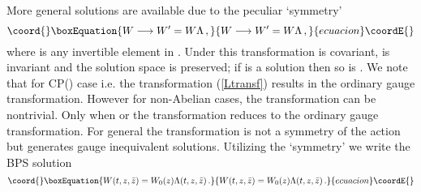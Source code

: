 \documentclass[a4paper,12pt]{article}
\def\Com{{\mathop{\hbox{\msym \char  '103}}}}
\begin{document}
More general solutions are available due to the peculiar \myHighlight{$GL(M,\Com)$}\coordHE{}  `symmetry'
\begin{equation}\coord{}\boxEquation{
W\longrightarrow W^{\prime}=W\Lambda\,,
\label{Ltransf}
}{
W\longrightarrow W^{\prime}=W\Lambda\,,
}{ecuacion}\coordE{}\end{equation}
where \myHighlight{$\Lambda$}\coordHE{} is any invertible element in \myHighlight{$GL(M,\Com)$}\coordHE{}.  Under this transformation \coordHE{} is covariant, \coordHE{} is invariant and the solution space is
preserved; if \coordHE{} is a solution then so is \coordHE{}.
We note that for CP(\coordHE{}) case i.e. \coordHE{}  the transformation (\ref{Ltransf}) results in   the  ordinary gauge transformation. However for non-Abelian
cases, \coordHE{}  the transformation can be nontrivial. Only when \coordHE{} or \coordHE{} the transformation  reduces to
the  ordinary gauge transformation.  For general \myHighlight{$\Lambda$}\coordHE{}  the transformation is not a symmetry of the action  but generates gauge inequivalent
solutions. Utilizing the `symmetry' we write the BPS solution
\begin{equation}\coord{}\boxEquation{\label{W}
W(t,z,\bar{z})=W_{0}(z)\Lambda(t,z,\bar{z})\,.
}{W(t,z,\bar{z})=W_{0}(z)\Lambda(t,z,\bar{z})\,.
}{ecuacion}\coordE{}\end{equation}
\end{document}

